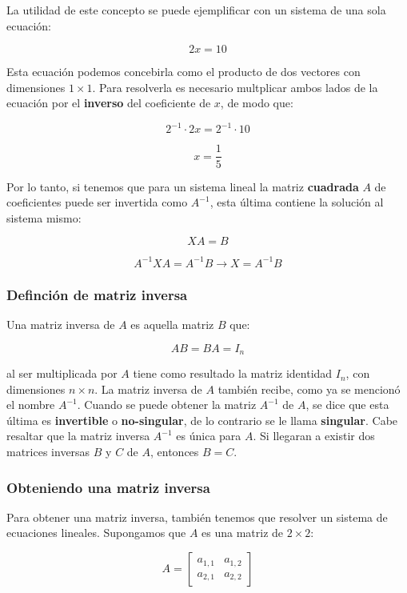 \documentclass[
]{book}
\begin{document}
La utilidad de este concepto se puede ejemplificar con un sistema de una sola ecuación:

\[2x = 10\]

Esta ecuación podemos concebirla como el producto de dos vectores con dimensiones \(1 \times 1\). Para resolverla es necesario multplicar ambos lados de la ecuación por el \textbf{inverso} del coeficiente de \(x\), de modo que:

\[2^{-1} \cdot 2x = 2^{-1} \cdot 10\]

\[x = \frac{1}{5}\]

Por lo tanto, si tenemos que para un sistema lineal la matriz \textbf{cuadrada} \(A\) de coeficientes puede ser invertida como \(A^{-1}\), esta última contiene la solución al sistema mismo:

\[XA = B\]

\[A^{-1}XA = A^{-1}B \rightarrow X = A^{-1}B\]

\hypertarget{definciuxf3n-de-matriz-inversa}{%
\subsubsection{Definción de matriz inversa}\label{definciuxf3n-de-matriz-inversa}}

Una matriz inversa de \(A\) es aquella matriz \(B\) que:

\[AB = BA = I_n\]

al ser multiplicada por \(A\) tiene como resultado la matriz identidad \(I_n\), con dimensiones \(n \times n\). La matriz inversa de \(A\) también recibe, como ya se mencionó el nombre \(A^{-1}\). Cuando se puede obtener la matriz \(A^{-1}\) de \(A\), se dice que esta última es \textbf{invertible} o \textbf{no-singular}, de lo contrario se le llama \textbf{singular}. Cabe resaltar que la matriz inversa \(A^{-1}\) es única para \(A\). Si llegaran a existir dos matrices inversas \(B\) y \(C\) de \(A\), entonces \(B=C\).

\hypertarget{obteniendo-una-matriz-inversa}{%
\subsubsection{Obteniendo una matriz inversa}\label{obteniendo-una-matriz-inversa}}

Para obtener una matriz inversa, también tenemos que resolver un sistema de ecuaciones lineales. Supongamos que \(A\) es una matriz de \(2 \times 2\):

\begin{equation}
A = \left[\begin{array}{ccc}
a_{1, 1} & a_{1, 2} \\
a_{2, 1} & a_{2, 2}
\end{array}
\right]
\end{equation}
\end{document}
